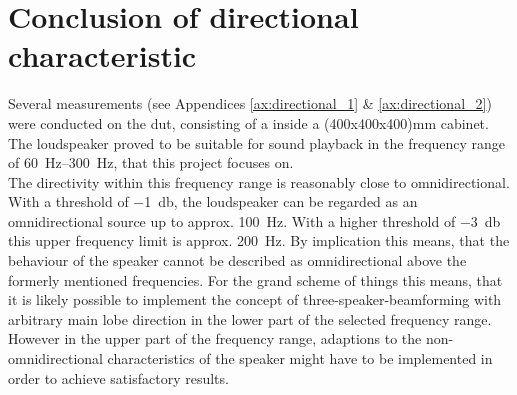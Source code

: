 \section{Conclusion of directional characteristic}
Several measurements (see Appendices \ref{ax:directional_1} \& \ref{ax:directional_2}) were conducted on the \gls{dut}, consisting of a \citep{seas33} inside a (400x400x400)\si{\milli\meter} cabinet. The loudspeaker proved to be suitable for sound playback in the frequency range of \SIrange{60}{300}{\hertz}, that this project focuses on.\\
The directivity within this frequency range is reasonably close to omnidirectional. With a threshold of \SI{-1}{\decibel}, the loudspeaker can be regarded as an omnidirectional source up to approx. \SI{100}{\hertz}. With a higher threshold of \SI{-3}{\decibel} this upper frequency limit is approx. \SI{200}{\hertz}. By implication this means, that the behaviour of the speaker cannot be described as omnidirectional above the formerly mentioned frequencies.
For the grand scheme of things this means, that it is likely possible to implement the concept of three-speaker-beamforming with arbitrary main lobe direction in the lower part of the selected frequency range. However in the upper part of the frequency range, adaptions to the non-omnidirectional characteristics of the speaker might have to be implemented in order to achieve satisfactory results.